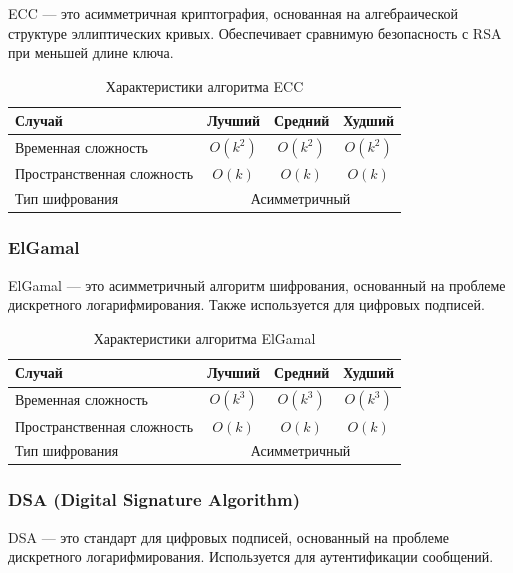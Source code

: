 \documentclass[a4paper,12pt]{article}
\begin{document}
ECC --- это асимметричная криптография, основанная на алгебраической структуре эллиптических кривых. Обеспечивает сравнимую безопасность с RSA при меньшей длине ключа.

\begin{table}[H]
    \centering
    \begin{tabular}{|l|c|c|c|}
        \hline
        Случай & Лучший & Средний & Худший \\
        \hline
        Временная сложность & $O(k^2)$ & $O(k^2)$ & $O(k^2)$ \\
        \hline
        Пространственная сложность & $O(k)$ & $O(k)$ & $O(k)$ \\
        \hline
        Тип шифрования & \multicolumn{3}{c|}{Асимметричный} \\
        \hline
    \end{tabular}
    \caption{Характеристики алгоритма ECC}
\end{table}

\subsubsection{ElGamal}
\label{subsubsec:elgamal}

ElGamal --- это асимметричный алгоритм шифрования, основанный на проблеме дискретного логарифмирования. Также используется для цифровых подписей.

\begin{table}[H]
    \centering
    \begin{tabular}{|l|c|c|c|}
        \hline
        Случай & Лучший & Средний & Худший \\
        \hline
        Временная сложность & $O(k^3)$ & $O(k^3)$ & $O(k^3)$ \\
        \hline
        Пространственная сложность & $O(k)$ & $O(k)$ & $O(k)$ \\
        \hline
        Тип шифрования & \multicolumn{3}{c|}{Асимметричный} \\
        \hline
    \end{tabular}
    \caption{Характеристики алгоритма ElGamal}
\end{table}

\subsubsection{DSA (Digital Signature Algorithm)}
\label{subsubsec:dsa-digital-signature-algorithm}

DSA --- это стандарт для цифровых подписей, основанный на проблеме дискретного логарифмирования. Используется для аутентификации сообщений.
\end{document}
